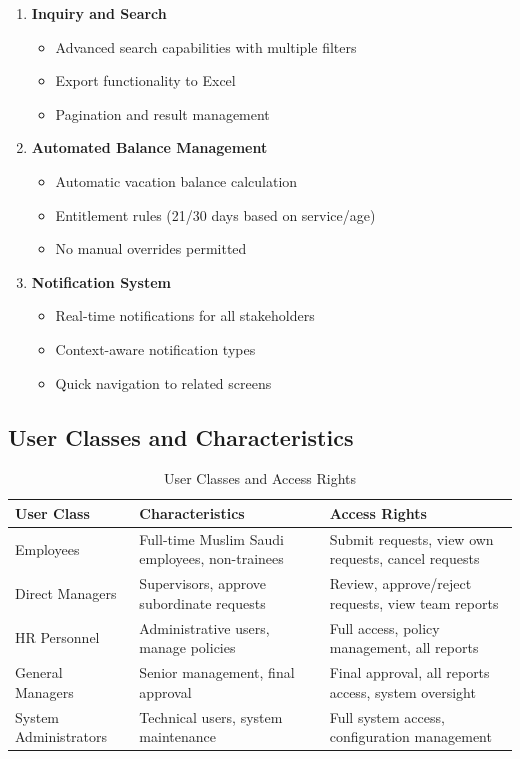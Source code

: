 \documentclass[12pt,a4paper]{article}
\begin{document}
\begin{enumerate}
    \item \textbf{Inquiry and Search}
    \begin{itemize}
        \item Advanced search capabilities with multiple filters
        \item Export functionality to Excel
        \item Pagination and result management
    \end{itemize}
    
    \item \textbf{Automated Balance Management}
    \begin{itemize}
        \item Automatic vacation balance calculation
        \item Entitlement rules (21/30 days based on service/age)
        \item No manual overrides permitted
    \end{itemize}
    
    \item \textbf{Notification System}
    \begin{itemize}
        \item Real-time notifications for all stakeholders
        \item Context-aware notification types
        \item Quick navigation to related screens
    \end{itemize}
\end{enumerate}

\subsection{User Classes and Characteristics}
\begin{table}[H]
\centering
\begin{tabular}{|p{3cm}|p{4cm}|p{4cm}|}
\hline
\textbf{User Class} & \textbf{Characteristics} & \textbf{Access Rights} \\
\hline
Employees & Full-time Muslim Saudi employees, non-trainees & Submit requests, view own requests, cancel requests \\
\hline
Direct Managers & Supervisors, approve subordinate requests & Review, approve/reject requests, view team reports \\
\hline
HR Personnel & Administrative users, manage policies & Full access, policy management, all reports \\
\hline
General Managers & Senior management, final approval & Final approval, all reports access, system oversight \\
\hline
System Administrators & Technical users, system maintenance & Full system access, configuration management \\
\hline
\end{tabular}
\caption{User Classes and Access Rights}
\end{table}
\end{document}
